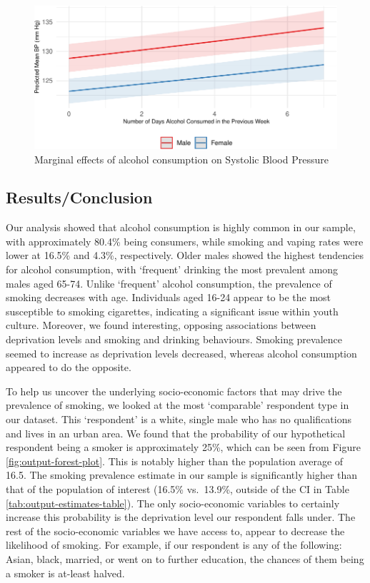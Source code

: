 \documentclass[
  11pt,
  twocolumn]{article}
\begin{document}
\begin{figure}[H]
\includegraphics{Coursework_files/figure-latex/output-effect-plots-alc-1} \caption{Marginal effects of alcohol consumption on Systolic Blood Pressure}\label{fig:output-effect-plots-alc}
\end{figure}

\subsection{Results/Conclusion}\label{resultsconclusion}

Our analysis showed that alcohol consumption is highly common in our
sample, with approximately 80.4\% being consumers, while smoking and
vaping rates were lower at 16.5\% and 4.3\%, respectively. Older males
showed the highest tendencies for alcohol consumption, with `frequent'
drinking the most prevalent among males aged 65-74. Unlike `frequent'
alcohol consumption, the prevalence of smoking decreases with age.
Individuals aged 16-24 appear to be the most susceptible to smoking
cigarettes, indicating a significant issue within youth culture.
Moreover, we found interesting, opposing associations between
deprivation levels and smoking and drinking behaviours. Smoking
prevalence seemed to increase as deprivation levels decreased, whereas
alcohol consumption appeared to do the opposite.

To help us uncover the underlying socio-economic factors that may drive
the prevalence of smoking, we looked at the most `comparable' respondent
type in our dataset. This `respondent' is a white, single male who has
no qualifications and lives in an urban area. We found that the
probability of our hypothetical respondent being a smoker is
approximately 25\%, which can be seen from Figure
\ref{fig:output-forest-plot}. This is notably higher than the population
average of 16.5. The smoking prevalence estimate in our sample is
significantly higher than that of the population of interest (16.5\%
vs.~13.9\%, outside of the CI in Table
\ref{tab:output-estimates-table}). The only socio-economic variables to
certainly increase this probability is the deprivation level our
respondent falls under. The rest of the socio-economic variables we have
access to, appear to decrease the likelihood of smoking. For example, if
our respondent is any of the following: Asian, black, married, or went
on to further education, the chances of them being a smoker is at-least
halved.
\end{document}
